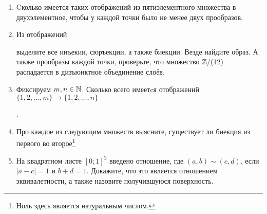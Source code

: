 \begin{enumerate}
    \item Cколько имеется таких отображений из пятиэлементного множества в двухэлементное, чтобы у каждой точки было не менее двух прообразов.
    \item Из отображений  выделите все инъекии, сюръекции, а также биекции. Везде найдите образ. А также прообразы каждой точки, проверьте, что множество $\mathbb Z/(12)$ распадается в дизъюнктное объединение слоёв.
    \item Фиксируем $m, n \in \mathbb N$. Сколько всего имеетcя отображений $\{1, 2, \ldots, m\} \to \{1, 2, \ldots, n\}$ .
\item Про каждое из следующим множеств выясните, существует ли биекция из первого во второе\footnote{Ноль здесь является натуральным числом.} 
\item На квадратном листе $[0;1]^2$ введено отношение, где $(a, b) \sim (c, d)$, если $|a-c| = 1$ и $b + d = 1$. Докажите, что это является отношением эквивалетности, а также назовите получившуюся поверхность.
\end{enumerate}

